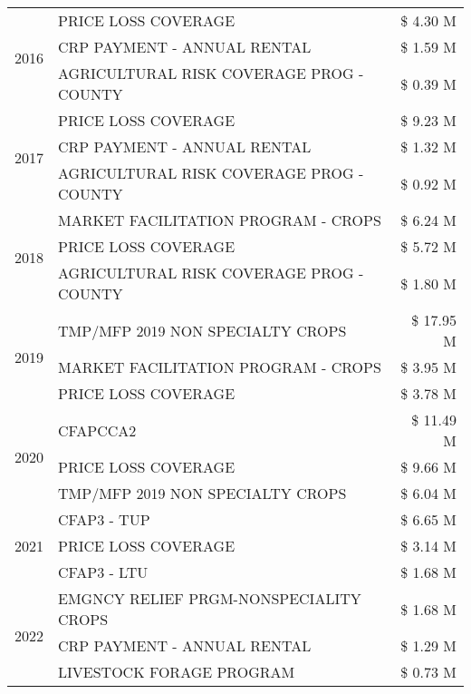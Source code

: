 \begin{tabular}{llr}
\cline{1-3}
\multirow[t]{3}{*}{2016} & PRICE LOSS COVERAGE & \$ 4.30 M \\
 & CRP PAYMENT - ANNUAL RENTAL & \$ 1.59 M \\
 & AGRICULTURAL RISK COVERAGE PROG - COUNTY & \$ 0.39 M \\
\cline{1-3}
\multirow[t]{3}{*}{2017} & PRICE LOSS COVERAGE & \$ 9.23 M \\
 & CRP PAYMENT - ANNUAL RENTAL & \$ 1.32 M \\
 & AGRICULTURAL RISK COVERAGE PROG - COUNTY & \$ 0.92 M \\
\cline{1-3}
\multirow[t]{3}{*}{2018} & MARKET FACILITATION PROGRAM - CROPS & \$ 6.24 M \\
 & PRICE LOSS COVERAGE & \$ 5.72 M \\
 & AGRICULTURAL RISK COVERAGE PROG - COUNTY & \$ 1.80 M \\
\cline{1-3}
\multirow[t]{3}{*}{2019} & TMP/MFP 2019 NON SPECIALTY CROPS & \$ 17.95 M \\
 & MARKET FACILITATION PROGRAM - CROPS & \$ 3.95 M \\
 & PRICE LOSS COVERAGE & \$ 3.78 M \\
\cline{1-3}
\multirow[t]{3}{*}{2020} & CFAPCCA2 & \$ 11.49 M \\
 & PRICE LOSS COVERAGE & \$ 9.66 M \\
 & TMP/MFP 2019 NON SPECIALTY CROPS & \$ 6.04 M \\
\cline{1-3}
\multirow[t]{3}{*}{2021} & CFAP3 - TUP & \$ 6.65 M \\
 & PRICE LOSS COVERAGE & \$ 3.14 M \\
 & CFAP3 - LTU & \$ 1.68 M \\
\cline{1-3}
\multirow[t]{3}{*}{2022} & EMGNCY RELIEF PRGM-NONSPECIALITY CROPS & \$ 1.68 M \\
 & CRP PAYMENT - ANNUAL RENTAL & \$ 1.29 M \\
 & LIVESTOCK FORAGE PROGRAM & \$ 0.73 M \\
\cline{1-3}
\bottomrule
\end{tabular}
